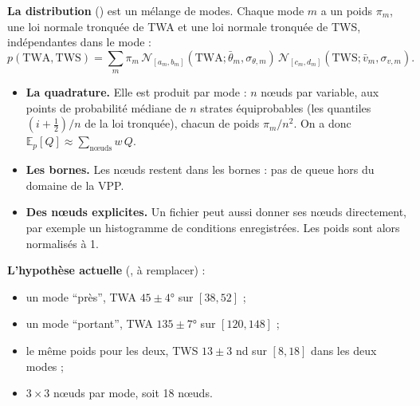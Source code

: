 \documentclass[10pt,a4paper]{article}
\begin{document}
\textbf{La distribution} () est un mélange de modes. Chaque mode $m$ a un poids
$\pi_m$, une loi normale tronquée de TWA et une loi normale tronquée de TWS, indépendantes dans le mode :
\[
  p(\mathrm{TWA},\mathrm{TWS})=\sum_m \pi_m\,\mathcal{N}_{[a_m,b_m]}(\mathrm{TWA};\bar\theta_m,\sigma_{\theta,m})\,
  \mathcal{N}_{[c_m,d_m]}(\mathrm{TWS};\bar v_m,\sigma_{v,m}).
\]
\begin{itemize}
  \item \textbf{La quadrature.} Elle est produit par mode : $n$ nœuds par variable, aux points de probabilité
        médiane de $n$ strates équiprobables (les quantiles $(i+\frac12)/n$ de la loi tronquée), chacun de
        poids $\pi_m/n^2$. On a donc $\mathbb{E}_p[Q]\approx\sum_{\text{nœuds}} w\,Q$.
  \item \textbf{Les bornes.} Les nœuds restent dans les bornes : pas de queue hors du domaine de la VPP.
  \item \textbf{Des nœuds explicites.} Un fichier peut aussi donner ses nœuds directement, par exemple un
        histogramme de conditions enregistrées. Les poids sont alors normalisés à 1.
\end{itemize}

\textbf{L'hypothèse actuelle} (, à remplacer) :
\begin{itemize}
  \item un mode \enquote{près}, TWA $45\pm4°$ sur $[38,52]$ ;
  \item un mode \enquote{portant}, TWA $135\pm7°$ sur $[120,148]$ ;
  \item le même poids pour les deux, TWS $13\pm3$ nd sur $[8,18]$ dans les deux modes ;
  \item $3\times3$ nœuds par mode, soit 18 nœuds.
\end{itemize}
\end{document}
